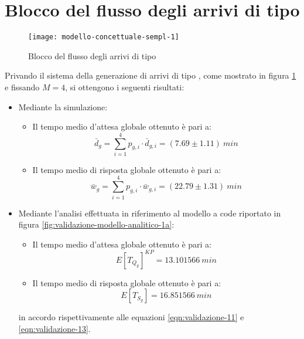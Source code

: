 \section{Blocco del flusso degli arrivi di tipo \sr{}}\label{sec:validazione-blocco-sr}
\begin{figure}[ht]
\centering
\texttt{[image: modello-concettuale-sempl-1]}
\caption{Blocco del flusso degli arrivi di tipo \sr{}}
\label{fig:validazione-semplificazione-1}
\end{figure}
Privando il sistema della generazione di arrivi di tipo \sr{}, come mostrato in figura \ref{fig:validazione-semplificazione-1} e fissando $M=4$, si ottengono i seguenti risultati:
\begin{itemize}
\item Mediante la simulazione:
\begin{itemize}
\item Il tempo medio d'attesa globale ottenuto è pari a:
\begin{equation} 
\bar{d}_g = \sum_{i = 1}^4 p_{g,i}\cdot \bar{d}_{g,i} = (7.69 \pm 1.11)\ min
\end{equation}
\item Il tempo medio di risposta globale ottenuto è pari a:
\begin{equation}
\bar{w}_g = \sum_{i = 1}^4 p_{g,i}\cdot \bar{w}_{g,i} = (22.79 \pm 1.31)\ min
\end{equation}
\end{itemize}

\item Mediante l'analisi effettuata in riferimento al modello a code riportato in figura \ref{fig:validazione-modello-analitico-1a}:
\begin{itemize}
\item Il tempo medio d'attesa globale ottenuto è pari a:
\begin{equation}
E[T_{Q_g}]^{KP} = 13.101566\ min 
\end{equation}
\item Il tempo medio di risposta globale ottenuto è pari a:
\begin{equation}
E[T_{S_g}] = 16.851566\ min 
\end{equation}
\end{itemize}
in accordo rispettivamente alle equazioni \ref{eqn:validazione-11} e \ref{eqn:validazione-13}.
\end{itemize}

